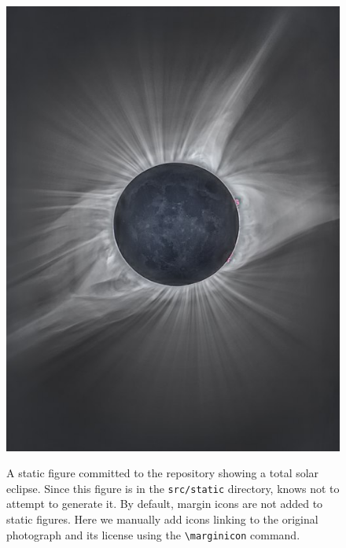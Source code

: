 \documentclass[twocolumn]{aastex631}
\begin{document}
\begin{figure}[ht!]
    \begin{centering}
        \includegraphics[width=0.75\linewidth]{static/eclipse.jpeg}
        \caption{
            A static figure committed to the repository showing a total solar eclipse. 
            Since this figure is in the \texttt{src/static} directory, \showyourwork knows not to attempt to generate it. 
            By default, margin icons are not added to static figures.
            Here we manually add icons linking to the original photograph and its license using the \texttt{\textbackslash marginicon} command.
        }
        \label{fig:eclipse}
    \end{centering}
\end{figure}
\end{document}

